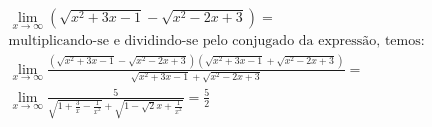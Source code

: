 \begin{ex}
\begin{align}
&\lim_{x\rightarrow \infty} (\sqrt{x^2+3x-1}-\sqrt{x^2-2x+3})=\nonumber\\
&\text{multiplicando-se e dividindo-se pelo conjugado da expressão, temos:}\nonumber\\
&\lim_{x\rightarrow \infty} \frac{(\sqrt{x^2+3x-1}-\sqrt{x^2-2x+3})(\sqrt{x^2+3x-1}+\sqrt{x^2-2x+3})}{\sqrt{x^2+3x-1}+\sqrt{x^2-2x+3}}=\nonumber\\
&\lim_{x\rightarrow \infty} \frac{5}{\sqrt{1+\frac{3}{x}-\frac{1}{x^2}}+\sqrt{1-\sqrt{2}{x}+\frac{1}{x^2}}}=\frac{5}{2}\nonumber
\end{align}
\end{ex}